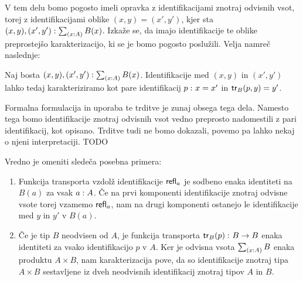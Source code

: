 V tem delu bomo pogosto imeli opravka z identifikacijami znotraj odvisnih vsot, torej z identifikacijami oblike \((x, y) = (x', y')\), kjer sta
\((x, y), (x', y') : \textstyle \sum_{\left( x : A \right)} B(x)\). Izkaže se, da imajo identifikacije te oblike preprostejšo karakterizacijo, ki se je bomo pogosto poslužili.
Velja namreč naslednje:
\begin{trditev}
  Naj bosta \((x, y), (x', y') : \textstyle \sum_{\left( x : A \right)} B(x)\). Identifikacije med \((x, y)\) in \((x', y')\) lahko tedaj karakteriziramo kot pare identifikacij
  \(p \,\colon x = x'\) in \(\textnormal{\textsf{tr}}_{B}(p, y) = y'\).
\end{trditev}
Formalna formulacija in uporaba te trditve je zunaj obsega tega dela. Namesto tega bomo identifikacije znotraj odvisnih vsot vedno preprosto nadomestili z pari identifikacij, kot opisano. Trditve tudi ne bomo dokazali, povemo pa lahko nekaj o njeni interpretaciji. TODO

Vredno je omeniti sledeča posebna primera:
\begin{enumerate}
\item Funkcija transporta vzdolž identifikacije \(\textnormal{\textsf{refl}}_{a}\) je sodbeno enaka identiteti na \(B(a)\) za vsak \(a : A\). Če na prvi komponenti identifikacije znotraj odvisne vsote torej vzamemo \(\textnormal{\textsf{refl}}_{a}\), nam na drugi komponenti ostanejo le identifikacije med \(y\) in \(y'\) v \(B(a)\).
\item Če je tip \(B\) neodvisen od \(A\), je funkcija transporta
  \(\textnormal{\textsf{tr}}_{B}(p) \,\colon B \to B\) enaka identiteti za vsako identifikacijo \(p\) v \(A\).
  Ker je odvisna vsota \(\textstyle \sum_{\left( x : A \right)} B\) enaka produktu \(A \times B\), nam karakterizacija pove, da so identifikacije znotraj tipa \(A \times B\) sestavljene iz dveh neodvisnih identifikacij znotraj tipov \(A\) in \(B\).
\end{enumerate}
